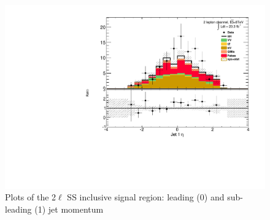 \begin{figure}[!htbp]
\begin{minipage}[h]{0.5\textwidth}
  \end{minipage}\hfill
  \begin{minipage}[h]{0.5\textwidth}
    \centering \includegraphics[width=\textwidth]{figs/results/plotCand_2lep_Jet1Eta}
  \end{minipage}\hfill
\caption{Plots of the 2$\ell$ SS inclusive signal region: leading (0) and sub-leading (1) jet momentum}  
\label{figure:results_2l_jet}  
\end{figure} 




